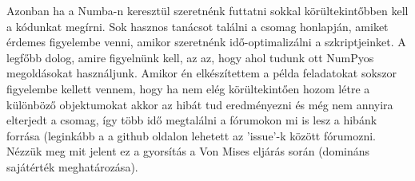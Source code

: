 \documentclass{article}
\theoremstyle{definition}
\theoremstyle{theorem}
\begin{document}
Azonban ha a Numba-n keresztül szeretnénk futtatni sokkal körültekintőbben kell a kódunkat megírni. Sok hasznos tanácsot találni a csomag honlapján, amiket érdemes figyelembe venni, amikor szeretnénk idő-optimalizálni a szkriptjeinket. A legfőbb dolog, amire figyelnünk kell, az az, hogy ahol tudunk ott NumPyos megoldásokat használjunk. Amikor én elkészítettem a példa feladatokat sokszor figyelembe kellett vennem, hogy ha nem elég körültekintően hozom létre a különböző objektumokat akkor az hibát tud eredményezni és még nem annyira elterjedt a csomag, így több idő megtalálni a fórumokon mi is lesz a hibánk forrása (leginkább a a github oldalon lehetett az 'issue'-k között fórumozni.\newline
Nézzük meg mit jelent ez a gyorsítás a Von Mises eljárás során (domináns sajátérték meghatározása).
\end{document}
